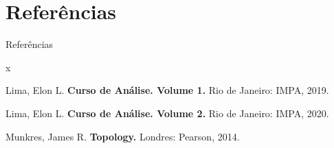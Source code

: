\documentclass[aspectratio=169]{beamer}
\begin{document}
	
	\section{Referências}
	
	\begin{frame}
		\begin{block}{Referências}
			\begin{thebibliography}{x}
			\footnotesize{
				
				 Lima, Elon L. {\bf Curso de Análise. Volume 1.} Rio de Janeiro: IMPA, 2019.
				
				 Lima, Elon L. {\bf Curso de Análise. Volume 2.} Rio de Janeiro: IMPA, 2020.
				
				 Munkres, James R. {\bf Topology.} Londres: Pearson, 2014.

				
			}
		\end{thebibliography}
		\end{block}
	\end{frame}

	
\end{document}
